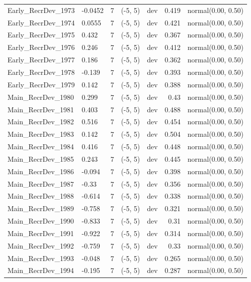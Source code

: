 \documentclass[
]{scrartcl}
\begin{document}
\begin{landscape}
\begin{longtable}{llrllrl}
Early\_RecrDev\_1973 & -0.0452 & 7 & (-5, 5) & dev & 0.419 & normal(0.00, 0.50) \\ 
Early\_RecrDev\_1974 & 0.0555 & 7 & (-5, 5) & dev & 0.421 & normal(0.00, 0.50) \\ 
Early\_RecrDev\_1975 & 0.432 & 7 & (-5, 5) & dev & 0.367 & normal(0.00, 0.50) \\ 
Early\_RecrDev\_1976 & 0.246 & 7 & (-5, 5) & dev & 0.412 & normal(0.00, 0.50) \\ 
Early\_RecrDev\_1977 & 0.186 & 7 & (-5, 5) & dev & 0.362 & normal(0.00, 0.50) \\ 
Early\_RecrDev\_1978 & -0.139 & 7 & (-5, 5) & dev & 0.393 & normal(0.00, 0.50) \\ 
Early\_RecrDev\_1979 & 0.142 & 7 & (-5, 5) & dev & 0.388 & normal(0.00, 0.50) \\ 
Main\_RecrDev\_1980 & 0.299 & 7 & (-5, 5) & dev & 0.43 & normal(0.00, 0.50) \\ 
Main\_RecrDev\_1981 & 0.403 & 7 & (-5, 5) & dev & 0.488 & normal(0.00, 0.50) \\ 
Main\_RecrDev\_1982 & 0.516 & 7 & (-5, 5) & dev & 0.454 & normal(0.00, 0.50) \\ 
Main\_RecrDev\_1983 & 0.142 & 7 & (-5, 5) & dev & 0.504 & normal(0.00, 0.50) \\ 
Main\_RecrDev\_1984 & 0.416 & 7 & (-5, 5) & dev & 0.448 & normal(0.00, 0.50) \\ 
Main\_RecrDev\_1985 & 0.243 & 7 & (-5, 5) & dev & 0.445 & normal(0.00, 0.50) \\ 
Main\_RecrDev\_1986 & -0.094 & 7 & (-5, 5) & dev & 0.398 & normal(0.00, 0.50) \\ 
Main\_RecrDev\_1987 & -0.33 & 7 & (-5, 5) & dev & 0.356 & normal(0.00, 0.50) \\ 
Main\_RecrDev\_1988 & -0.614 & 7 & (-5, 5) & dev & 0.338 & normal(0.00, 0.50) \\ 
Main\_RecrDev\_1989 & -0.758 & 7 & (-5, 5) & dev & 0.321 & normal(0.00, 0.50) \\ 
Main\_RecrDev\_1990 & -0.833 & 7 & (-5, 5) & dev & 0.31 & normal(0.00, 0.50) \\ 
Main\_RecrDev\_1991 & -0.922 & 7 & (-5, 5) & dev & 0.314 & normal(0.00, 0.50) \\ 
Main\_RecrDev\_1992 & -0.759 & 7 & (-5, 5) & dev & 0.33 & normal(0.00, 0.50) \\ 
Main\_RecrDev\_1993 & -0.048 & 7 & (-5, 5) & dev & 0.265 & normal(0.00, 0.50) \\ 
Main\_RecrDev\_1994 & -0.195 & 7 & (-5, 5) & dev & 0.287 & normal(0.00, 0.50) \\ 

\end{longtable}
\end{landscape}
\end{document}
